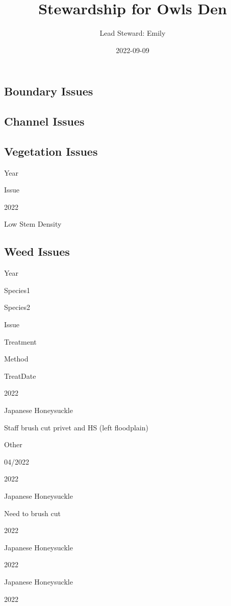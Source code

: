 \documentclass[
  landscape]{article}
\title{Stewardship for Owls Den}
\author{Lead Steward: Emily}
\date{2022-09-09}
\begin{document}
\maketitle

\hypertarget{boundary-issues}{%
\subsection{Boundary Issues}\label{boundary-issues}}

\hypertarget{channel-issues}{%
\subsection{Channel Issues}\label{channel-issues}}

\hypertarget{vegetation-issues}{%
\subsection{Vegetation Issues}\label{vegetation-issues}}

Year

Issue

2022

Low Stem Density

\hypertarget{weed-issues}{%
\subsection{Weed Issues}\label{weed-issues}}

Year

Species1

Species2

Issue

Treatment

Method

TreatDate

2022

Japanese Honeysuckle

Staff brush cut privet and HS (left floodplain)

Other

04/2022

2022

Japanese Honeysuckle

Need to brush cut

2022

Japanese Honeysuckle

2022

Japanese Honeysuckle

2022
\end{document}
